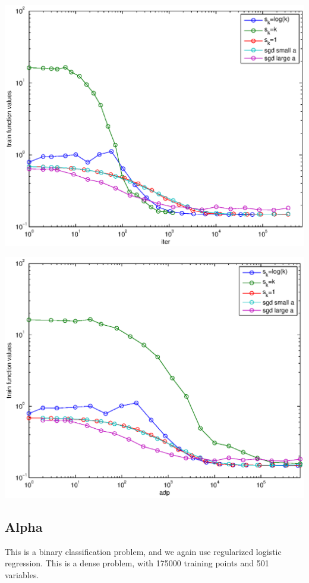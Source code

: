 \documentclass[12pt]{article}
\begin{document}
	\includegraphics{Figures/12-7-iter.eps}
	
	\includegraphics{Figures/12-7-adp.eps}    
	\subsection{Alpha}
	This is a binary classification problem, and we again use regularized logistic regression. This is a dense problem, with 175000 training points and 501 variables. 
	
\end{document}
